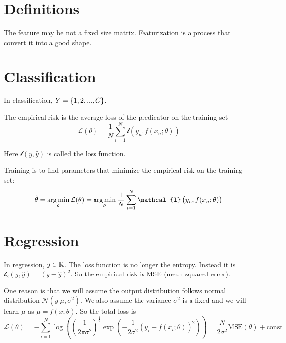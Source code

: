 \section{Definitions}




The feature may be not a fixed size matrix. Featurization is a process that convert it into a good shape.


\section{Classification}
In classification, $Y = \set{1, 2, ... , C}$.

\begin{definition}\label{empirical_risk}
    The empirical risk is the average loss of the predicator on the training set
    \begin{equation}
        \mathcal{L}(\theta) = \frac{1}{N} \sum_{i=1}^N \mathcal{l}\left( y_n, f(x_n; \theta) \right)
    \end{equation}
    
    Here $\mathcal{l}(y, \hat{y})$ is called the loss function.
\end{definition}

\begin{definition}[Training]
    Training is to find parameters that minimize the empirical risk on the training set:
    \begin{equation}
        \hat{\theta} = \argmin{\theta}\mathcal{L}(\theta) = \argmin{\theta} \frac{1}{N} \sum_{i=1}^N \mathcal{l}\left( y_n, f(x_n; \theta) \right)
    \end{equation}
\end{definition}

\section{Regression}

In regression, $y \in \mathbb{R}$. The loss function is no longer the entropy. Instead it is $\mathcal{l}_2 (y, \hat{y}) = (y - \hat{y})^2$. So the empirical risk is $\mathrm{MSE}$ (mean squared error).

\begin{theorem}
    One reason is that we will assume the output distribution follows normal distribution $\mathcal{N}(y|\mu,\sigma^2)$. We also assume the variance $\sigma^2$ is a fixed and we will learn $\mu$ as $\mu = f(x;\theta)$. So the total loss is
\begin{equation}
    \mathcal{L}(\theta) = - \sum_{i=1}^N \log \left( \left(\frac{1}{2\pi \sigma^2}\right)^{\frac{1}{2}} \exp\left(- \frac{1}{2 \sigma^2} \left( y_i - f(x_i ; \theta) \right)^2 \right) \right) = \frac{N}{2\sigma^2} \mathrm{MSE}(\theta) + \mathrm{const}
\end{equation}
\end{theorem}




